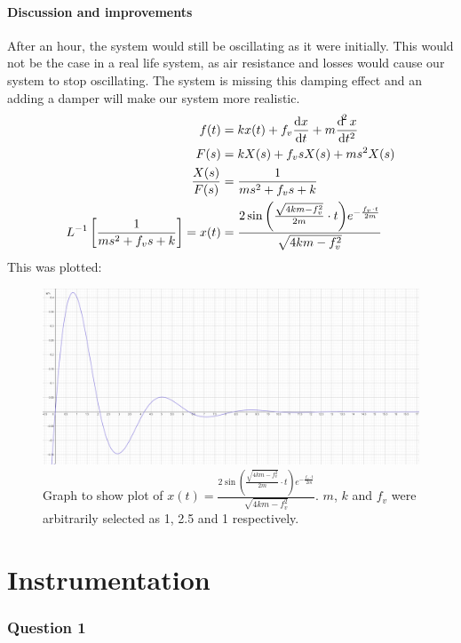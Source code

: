 \documentclass[12pt]{article}
\numberwithin{equation}{section}
\begin{document}
\subsection{Discussion and improvements}
After an hour, the system would still be oscillating as it were initially. This would not be the case in a real life system, as air resistance and losses would cause our system to stop oscillating. The system is missing this damping effect and an adding a damper will make our system more realistic.
\begin{align}
  f(t) &= kx(t) + f_v \frac{\dif x}{\dif t} + m \frac{\dif ^2 x}{\dif t^2}\\
  F(s) &= kX(s) + f_v s X(s) + m s^2 X(s)\\
  \frac{X(s)}{F(s)} &= \frac{1}{ms^2 + f_v s + k}\\
  L^{-1}\left[ \frac{1}{ms^2 + f_v s + k} \right] = x(t) &= \frac{2\sin{\left(\frac{\sqrt{4km-f_v^2 }}{2m} \cdot t\right)}e^{-\frac{f_v \cdot t}{2m}}}{\sqrt{4km - f_v^2}}
\end{align}
This was plotted:
\begin{figure}[H]
  \centering
  \includegraphics[width=\textwidth]{./img/3-2timeresponsedamped.png}
  \caption{Graph to show plot of $x(t) = \frac{2\sin{\left(\frac{\sqrt{4km-f_v^2 }}{2m} \cdot t\right)}e^{-\frac{f_v \cdot t}{2m}}}{\sqrt{4km - f_v^2}}$. $m$, $k$ and $f_v$ were arbitrarily selected as 1, 2.5 and 1 respectively.}
\end{figure}
\part{Instrumentation}
\section{Question 1}
\end{document}

